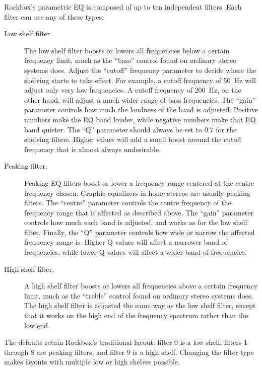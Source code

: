   Rockbox's parametric EQ is composed of up to ten independent filters. Each
  filter can use any of these types:
  \begin{description}
  \item[Low shelf filter.]
        The low shelf filter boosts or lowers all frequencies below a certain
        frequency limit, much as the ``bass'' control found on ordinary
        stereo systems does.
        Adjust the ``cutoff'' frequency parameter to decide where the shelving
        starts to take effect. For example, a cutoff frequency of 50~Hz will
        adjust only very low frequencies. A cutoff frequency of 200~Hz, on the
        other hand, will adjust a much wider range of bass frequencies.
        The ``gain'' parameter controls how much the loudness of the band is
        adjusted. Positive numbers make the EQ band louder, while negative
        numbers make that EQ band quieter.
        The ``Q'' parameter should always be set to 0.7 for the shelving
        filters. Higher values will add a small boost around the cutoff
        frequency that is almost always undesirable.
  \item[Peaking filter.]
        Peaking EQ filters boost or lower a frequency range centered at the
        centre frequency chosen.
        Graphic equalizers in home stereos are usually peaking
        filters. The ``centre'' parameter
        controls the centre frequency of the frequency range that is affected
        as described above.
        The ``gain'' parameter controls how much each band is adjusted, and
        works as for the low shelf filter.
        Finally, the ``Q'' parameter controls how wide or narrow the affected
        frequency range is. Higher Q values will affect a narrower band of
        frequencies, while lower Q values will affect a wider band of
        frequencies.
  \item[High shelf filter.]
        A high shelf filter boosts or lowers all frequencies above a certain
        frequency limit, much as the ``treble'' control found on ordinary
        stereo systems does.
        The high shelf filter is adjusted the same way as the low shelf filter,
        except that it works on the high end of the frequency spectrum rather
        than the low end.
  \end{description}
  The defaults retain Rockbox's traditional layout: filter 0 is a low shelf,
  filters 1 through 8 are peaking filters, and filter 9 is a high shelf.
  Changing the filter type makes layouts with multiple low or high shelves
  possible.

